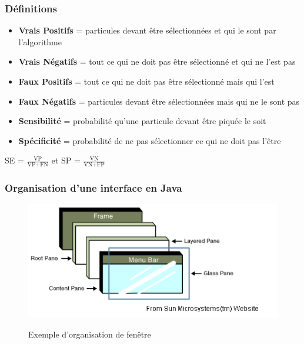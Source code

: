 \documentclass[11pt]{beamer}
\begin{document}
\begin{frame}
\frametitle{Définitions}
\begin{itemize}

\item \textbf{Vrais Positifs} = particules devant être sélectionnées et qui le sont par l'algorithme \\
\item \textbf{Vrais Négatifs}  = tout ce qui ne doit pas être sélectionné et qui ne l'est pas \\
\item \textbf{Faux Positifs} = tout ce qui ne doit pas être sélectionné mais qui l'est \\
\item \textbf{Faux Négatifs} = particules devant être sélectionnées mais qui ne le sont pas \\ 
\item \textbf{Sensibilité} = probabilité qu'une particule devant être piquée le soit \\
\item \textbf{Spécificité} = probabilité de ne pas sélectionner ce qui ne doit pas l'être \\

\end{itemize}
\begin{center}
SE = $\frac{\text{VP}}{\text{VP+FN}}$ et SP = $\frac{\text{VN}}{\text{VN+FP}}$ \\
\end{center}
\end{frame}

\begin{frame}
\frametitle{Organisation d'une interface en Java}
\begin{figure}
	\includegraphics[scale=0.6]{Introduction_4.png}
	
	Exemple d'organisation de fenêtre
\end{figure}
\end{frame}
\end{document}
